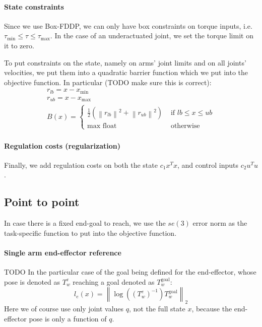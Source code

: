 \paragraph{State constraints}
Since we use Box-FDDP, we can only have box constraints on torque inputs,
i.e. $ \tau_{ \min } \leq \tau \leq \tau_{ \max } $.
In the case of an underactuated joint, we set the torque limit on it to zero.

To put constraints on the state, 
namely on arms' joint limits and on all joints' velocities, 
we put them into a quadratic barrier function 
which we put into the objective function.
In particular (TODO make sure this is correct):
\begin{gather}
		r_{ lb } = x - x_{ \min } \\
		r_{ ub } = x - x_{ \max } \\
		B(x) =
\left\{ 
\begin{array}{ll}
		\frac{1}{2}  (\left\lVert r_{ lb } \right \rVert ^{ 2 }
		+ \left\lVert r_{ ub } \right \rVert ^{ 2 }) & \text{ if } 
		lb \leq x \leq ub \\
		\max \text{ float} & \text{ otherwise}
\end{array}
\right . 
\end{gather}

\paragraph{Regulation costs (regularization)}
Finally, we add regulation costs on both the state $ c_{ 1 } x^{ T }x  $,
and control inputs $ c_{ 2 } u^{ T }u  $.


\subsection{Point to point}
In case there is a fixed end-goal to reach, we use the $se(3)$ error
norm as the task-specific function to put into the objective function.

\paragraph{Single arm end-effector reference} TODO
In the particular case of the goal being defined for the end-effector,
whose pose is denoted as $   T_{ w }^{ e }$ reaching a goal
denoted as $   T_{ w }^{ \text{goal} }$:
\begin{equation}
l_{ e } (x)= \left\lVert 
\log \left( \left( T_{ w }^{ e } \right)^{ -1 } \right) T_{ w }^{ \text{goal} }
\right \rVert _{ 2 }
\end{equation}
Here we of course use only joint values $ q  $, not the full state $ x  $,
because the end-effector pose is only a function of $ q  $.

